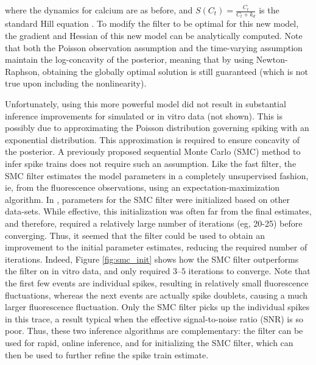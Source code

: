 \noindent where the dynamics for calcium are as before, and $S(C_t)=\frac{C_t}{C_t + k_d}$ is the standard Hill equation \cite{PologrutoSvoboda04}.  To modify the \foopsi filter to be optimal for this new model, the gradient and Hessian of this new model can be analytically computed.  Note that both the Poisson observation assumption and the time-varying assumption maintain the log-concavity of the posterior, meaning that by using Newton-Raphson, obtaining the globally optimal solution is still guaranteed (which is not true upon including the nonlinearity).   

Unfortunately, using this more powerful model did not result in substantial inference improvements for simulated or in vitro data (not shown).  This is possibly due to approximating the Poisson distribution governing spiking with an exponential distribution.  This approximation is required to ensure concavity of the posterior.  A previously proposed sequential Monte Carlo (SMC) method to infer spike trains \cite{VogelsteinPaninski09} does not require such an assumption. Like the fast filter, the SMC filter estimates the model parameters in a completely unsupervised fashion, ie, from the fluorescence observations, using an expectation-maximization algorithm.  In \cite{VogelsteinPaninski09}, parameters for the SMC filter were initialized based on other data-sets.  While effective, this initialization was often far from the final estimates, and therefore, required a relatively large number of iterations (eg, 20-25) before converging.  Thus, it seemed that the \foopsi filter could be used to obtain an improvement to the initial parameter estimates, reducing the required number of iterations.  Indeed, Figure \ref{fig:smc_init} shows how the SMC filter outperforms the \foopsi filter on in vitro data, and only required $3$--$5$ iterations to converge.  Note that the first few events are individual spikes, resulting in relatively small fluorescence fluctuations, whereas the next events are actually spike doublets, causing a much larger fluorescence fluctuation.  Only the SMC filter picks up the individual spikes in this trace, a result typical when the effective signal-to-noise ratio (SNR) is so poor.  Thus, these two inference algorithms are complementary: the \foopsi filter can be used for rapid, online inference, and for initializing the SMC filter, which can then be used to further refine the spike train estimate.

